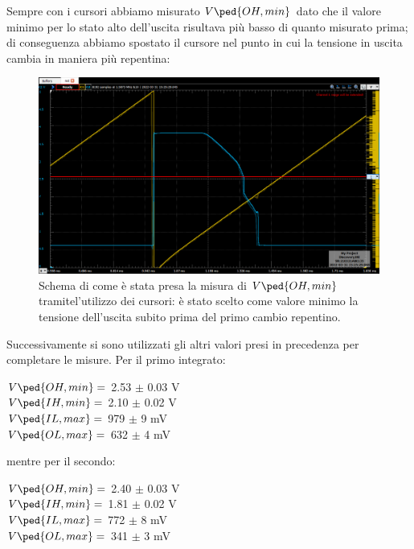 \documentclass[10pt, a4paper, italian]{article}
\begin{document}
Sempre con i cursori abbiamo misurato $V\ped{OH, min}$ dato che il valore
minimo per lo stato alto dell'uscita risultava più basso di
quanto misurato prima; di conseguenza abbiamo spostato il cursore nel punto
in cui la tensione in uscita cambia in maniera più repentina:
\begin{figure}
\centering
	\includegraphics[scale=0.4]{trans1}
	\caption{Schema di come è stata presa la misura di $V\ped{OH, min}$ tramitel'utilizzo dei cursori: è stato scelto come valore minimo la tensione dell'uscita subito prima del primo cambio repentino.}
	\label{fig: trans1}
\end{figure}
Successivamente si sono utilizzati gli altri valori presi in precedenza per completare le misure.
Per il primo integrato:
\begin{multicols}{2}
    \centering
    $V\ped{OH, min}=$ 2.53 $\pm$ 0.03 V\\
    $V\ped{IH, min}=$ 2.10 $\pm$ 0.02 V\\
    
    $V\ped{IL, max}=$ 979 $\pm$ 9 mV\\
    $V\ped{OL, max}=$ 632 $\pm$ 4 mV\\
\end{multicols}
mentre per il secondo:
\begin{multicols}{2}
    \centering
    $V\ped{OH, min}=$ 2.40 $\pm$ 0.03 V\\
    $V\ped{IH, min}=$ 1.81 $\pm$ 0.02 V\\
    
    $V\ped{IL, max}=$ 772 $\pm$ 8 mV\\
    $V\ped{OL, max}=$ 341 $\pm$ 3 mV\\
\end{multicols}
\end{document}

